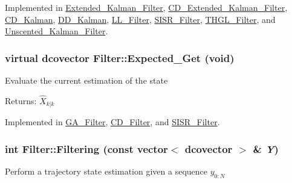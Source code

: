 Implemented in \hyperlink{class_extended___kalman___filter_5cfabc6d2256b22baca0a908d29c9c7e}{Extended\_\-Kalman\_\-Filter}, \hyperlink{class_c_d___extended___kalman___filter_7cfd2bf966970f44f4e1480ed3852b69}{CD\_\-Extended\_\-Kalman\_\-Filter}, \hyperlink{class_c_d___kalman_ecef658eac67b1005d9e86ec30708300}{CD\_\-Kalman}, \hyperlink{class_d_d___kalman_a04e9be77c495296673227860833c9fc}{DD\_\-Kalman}, \hyperlink{class_l_l___filter_ab2b4b545d401d54c66f63a41fa1a99d}{LL\_\-Filter}, \hyperlink{class_s_i_s_r___filter_e6aac1c96b9c6803425fd712cbf730d1}{SISR\_\-Filter}, \hyperlink{class_t_h_g_l___filter_2139ff41dc0eaa613847429c266ba7a5}{THGL\_\-Filter}, and \hyperlink{class_unscented___kalman___filter_ee1e0a8035111d7695b6958c644f97cc}{Unscented\_\-Kalman\_\-Filter}.\hypertarget{class_filter_f6e41ec8ada47571291b31a259858cdc}{
\subsubsection[{Expected\_\-Get}]{\setlength{\rightskip}{0pt plus 5cm}virtual dcovector Filter::Expected\_\-Get (void)}}
\label{class_filter_f6e41ec8ada47571291b31a259858cdc}


Evaluate the current estimation of the state

\begin{Desc}
\item[Returns:]$ \hat{X}_{k|k} $ \end{Desc}


Implemented in \hyperlink{class_g_a___filter_e92898cc15e34358cb9ecabd57067a39}{GA\_\-Filter}, \hyperlink{class_c_d___filter_f5c2b82877e5cdad1e0cc782374809b0}{CD\_\-Filter}, and \hyperlink{class_s_i_s_r___filter_2d1eb0ceb62531ed48af9a424bc62210}{SISR\_\-Filter}.\hypertarget{class_filter_d7944eca3250087246371a2f77e50f87}{
\subsubsection[{Filtering}]{\setlength{\rightskip}{0pt plus 5cm}int Filter::Filtering (const vector$<$ dcovector $>$ \& {\em Y})}}
\label{class_filter_d7944eca3250087246371a2f77e50f87}


Perform a trajectory state estimation given a sequence $ y_{0:N}$

